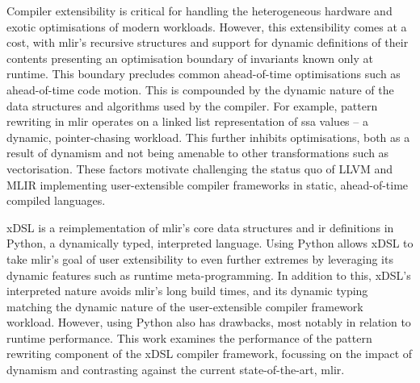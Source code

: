 Compiler extensibility is critical for handling the heterogeneous hardware and exotic optimisations of modern workloads.
However, this extensibility comes at a cost, with \ac{mlir}'s recursive structures and support for dynamic definitions of their contents presenting an optimisation boundary of invariants known only at runtime. This boundary precludes common ahead-of-time optimisations such as ahead-of-time code motion.
This is compounded by the dynamic nature of the data structures and algorithms used by the compiler. For example, pattern rewriting in \ac{mlir} operates on a linked list representation of \ac{ssa} values -- a dynamic, pointer-chasing workload.
This further inhibits optimisations, both as a result of dynamism and not being amenable to other transformations such as vectorisation.
These factors motivate challenging the status quo of LLVM and MLIR implementing user-extensible compiler frameworks in static, ahead-of-time compiled languages.







xDSL \cite{fehrXDSLSidekickCompilation2025} is a reimplementation of \ac{mlir}'s core data structures and \ac{ir} definitions in Python, a dynamically typed, interpreted language.
Using Python allows xDSL to take \ac{mlir}'s goal of user extensibility to even further extremes by leveraging its dynamic features such as runtime meta-programming.
In addition to this, xDSL's interpreted nature avoids \ac{mlir}'s long build times, and its dynamic typing matching the dynamic nature of the user-extensible compiler framework workload.
However, using Python also has drawbacks, most notably in relation to runtime performance.
This work examines the performance of the pattern rewriting component of the xDSL compiler framework, focussing on the impact of dynamism and contrasting against the current state-of-the-art, \ac{mlir}.



